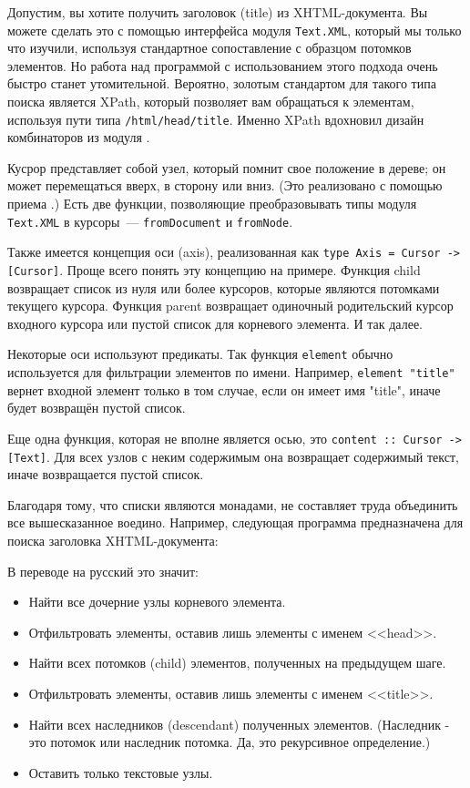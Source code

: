 Допустим, вы хотите получить заголовок (title) из XHTML-документа. Вы можете сделать это с помощью интерфейса модуля \lstinline!Text.XML!, который мы только что изучили, используя стандартное сопоставление с образцом потомков элементов. Но работа над программой с использованием этого подхода очень быстро станет утомительной. Вероятно, золотым стандартом для такого типа поиска является XPath, который позволяет вам обращаться к элементам, используя пути типа \lstinline!/html/head/title!. Именно XPath вдохновил дизайн комбинаторов из модуля .

Кусрор представляет собой узел, который помнит свое положение в дереве; он может перемещаться вверх, в сторону или вниз. (Это реализовано с помощью приема .) Есть две функции, позволяющие преобразовывать типы модуля \lstinline!Text.XML! в курсоры~--- \lstinline!fromDocument! и \lstinline!fromNode!.

Также имеется концепция оси (axis), реализованная как \lstinline!type Axis = Cursor -> [Cursor]!. Проще всего понять эту концепцию на примере. Функция child возвращает список из нуля или более курсоров, которые являются потомками текущего курсора. Функция parent возвращает одиночный родительский курсор входного курсора или пустой список для корневого элемента. И так далее.

Некоторые оси используют предикаты. Так функция \lstinline!element! обычно используется для фильтрации элементов по имени. Например, \lstinline!element "title"! вернет входной элемент только в том случае, если он имеет имя "title", иначе будет возвращён пустой список.

Еще одна функция, которая не вполне является осью, это \lstinline!content :: Cursor -> [Text]!. Для всех узлов с неким содержимым она возвращает содержимый текст, иначе возвращается пустой список.

Благодаря тому, что списки являются монадами, не составляет труда объединить все вышесказанное воедино. Например, следующая программа предназначена для поиска заголовка XHTML-документа:


В переводе на русский это значит:
\begin{itemize}
\item Найти все дочерние узлы корневого элемента.
\item Отфильтровать элементы, оставив лишь элементы с именем <<head>>.
\item Найти всех потомков (child) элементов, полученных на предыдущем шаге.
\item Отфильтровать элементы, оставив лишь элементы с именем <<title>>.
\item Найти всех наследников (descendant) полученных элементов. (Наследник - это потомок или наследник потомка. Да, это рекурсивное определение.)
\item Оставить только текстовые узлы.
\end{itemize}


